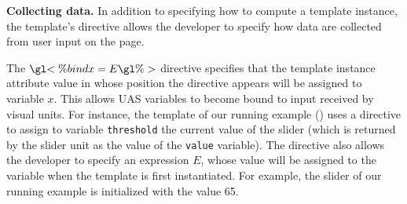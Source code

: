 


{\bf Collecting data.} In addition to specifying how to compute a template instance, the template's  directive allows the developer to specify how data are collected from user input on the page.

The $\gl{<\% bind } x = E \gl{ \%>}$ directive specifies that the template instance attribute value in whose position the directive appears will be assigned to variable $x$. This allows UAS variables to become bound to input received by visual units.    For instance, the template of our running example () uses a  directive to assign to variable \texttt{threshold} the current value of the slider (which is returned by the slider unit as the value of the \texttt{value} variable). The  directive also allows the developer to specify an expression $E$, whose value will be assigned to the variable when the template is first instantiated. For example, the slider of our running example is initialized with the value 65.\\

